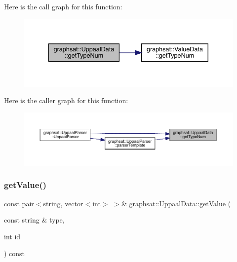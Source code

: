 Here is the call graph for this function\+:\nopagebreak
\begin{figure}[H]
\begin{center}
\leavevmode
\includegraphics[width=336pt]{classgraphsat_1_1_uppaal_data_a1c420132ab6e3cfe21bd0fec604c8519_cgraph}
\end{center}
\end{figure}
Here is the caller graph for this function\+:\nopagebreak
\begin{figure}[H]
\begin{center}
\leavevmode
\includegraphics[width=350pt]{classgraphsat_1_1_uppaal_data_a1c420132ab6e3cfe21bd0fec604c8519_icgraph}
\end{center}
\end{figure}
\mbox{\label{classgraphsat_1_1_uppaal_data_a0990d1da543e593b05bba3791cd351d8}} 
\subsubsection{\texorpdfstring{getValue()}{getValue()}\hspace{0.1cm}{\footnotesize\ttfamily [1/2]}}
{\footnotesize\ttfamily const pair$<$string, vector$<$int$>$ $>$\& graphsat\+::\+Uppaal\+Data\+::get\+Value (\begin{DoxyParamCaption}\item[{const string \&}]{type,  }\item[{int}]{id }\end{DoxyParamCaption}) const\hspace{0.3cm}{\ttfamily [inline]}}

